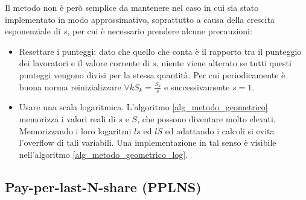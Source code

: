 Il metodo non è però semplice da mantenere nel caso in cui sia stato implementato in modo approssimativo, soprattutto a causa della crescita esponenziale di $s$, per cui è necessario prendere alcune precauzioni:
\begin{itemize}
    \item Resettare i punteggi: dato che quello che conta è il rapporto tra il punteggio dei lavoratori e il valore corrente di $s$, niente viene alterato se tutti questi punteggi vengono divisi per la stessa quantità. Per cui periodicamente è buona norma reinizializzare $\forall k S_k = \frac{S_k}{s}$ e successivamente $s=1$.
    \item Usare una scala logaritmica. L'algoritmo \ref{alg_metodo_geometrico} memorizza i valori reali di $s$ e $S$, che possono diventare molto elevati. Memorizzando i loro logaritmi $ls$ ed $lS$ ed adattando i calcoli si evita l'overflow di tali variabili. Una implementazione in tal senso è visibile nell'algoritmo \ref{alg_metodo_geometrico_log}.
\end{itemize}



\subsection{Pay-per-last-N-share (PPLNS)}

